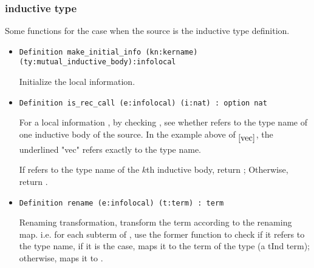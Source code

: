 \documentclass[a4paper,UKenglish,cleveref, autoref, thm-restate]{lipics-v2021}
\begin{document}
\subsubsection{inductive type}
Some functions for the case when the source is the inductive type definition.
\begin{itemize}

\item 
\begin{lstlisting}[language = {Coq}, basicstyle = \small]
Definition make_initial_info (kn:kername) (ty:mutual_inductive_body):infolocal
\end{lstlisting}

Initialize the local information.


\item
\begin{lstlisting}[language = {Coq}, basicstyle = \small]
Definition is_rec_call (e:infolocal) (i:nat) : option nat
\end{lstlisting}
For a local information , by checking , see whether  refers to the type name of one inductive body of the source. In the example above of $_{\ref{vec}}$, the underlined "vec" refers exactly to the type name.


If  refers to the type name of the $k$th inductive body, return ; Otherwise, return .



\item
\begin{lstlisting}[language = {Coq}, basicstyle = \small]
Definition rename (e:infolocal) (t:term) : term
\end{lstlisting}
Renaming transformation, transform the term  according to the renaming map. i.e. for each subterm  of ,
use the former function to check if it refers to the type name, if it is the case, maps it to the term of the type (a tInd term); otherwise, maps it to . 

\end{itemize}
\end{document}
